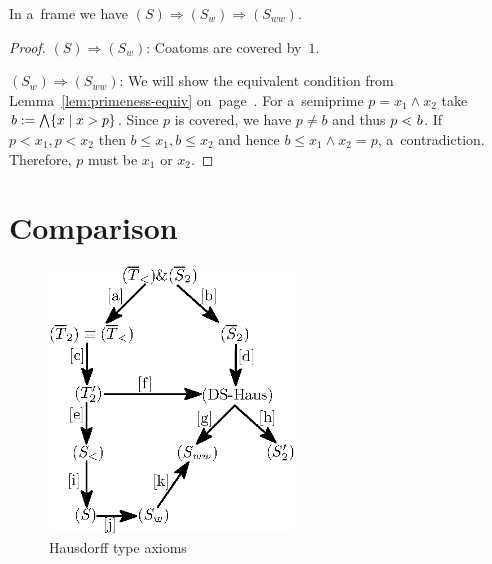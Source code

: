 \begin{prop} \label{prop:S->Sw->Sww}
  In a~frame we have $(S) \Rightarrow (S_w) \Rightarrow (S_{ww})$.
\end{prop}
\begin{proof}
  $(S) \Rightarrow (S_w)$:
  Coatoms are covered by~$1$.

  $(S_w) \Rightarrow (S_{ww})$:
  We will show the equivalent condition from Lemma~\ref{lem:primeness-equiv}
  on~page~\pageref{lem:primeness-equiv}.
  For a~semiprime $p = x_1 \wedge x_2$ take $b := \bigwedge \{ x \mid x > p \}$.
  Since $p$ is covered, we have $p \ne b$ and thus $p <\mkern-12mu\cdot\mkern8mu b$.
  If $p < x_1, p < x_2$ then $b \le x_1, b \le x_2$ and hence $b \le x_1 \wedge
  x_2 = p$, a~contradiction.
  Therefore, $p$ must be $x_1$ or $x_2$.
\end{proof}

\section{Comparison}

\begin{figure}[h]
  \centering
  \includegraphics[width=65mm]{../img/Hausdorff_diagram.eps}
  \caption{Hausdorff type axioms}
  \label{fig:haus-diagram}
\end{figure}


